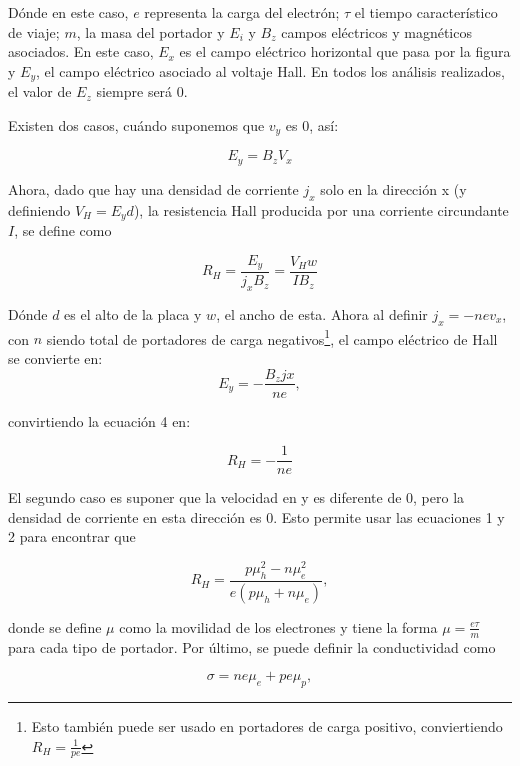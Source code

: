 \documentclass[%
 reprint,
 amsmath,amssymb,
 aps,
]{revtex4-1}
\begin{document}
Dónde en este caso, $e$ representa la carga del electrón; $\tau$ el tiempo característico de viaje; $m$, la masa del portador y $E_i$ y $B_z$ campos eléctricos y magnéticos asociados. En este caso, $E_x$ es el campo eléctrico horizontal que pasa por la figura y $E_y$, el campo eléctrico asociado al voltaje Hall. En todos los análisis realizados, el valor de $E_z$ siempre será 0.

Existen dos casos, cuándo suponemos que $v_y$ es 0, así:

\begin{equation*}
    E_y=B_zV_x 
\end{equation*}

Ahora, dado que hay una densidad de corriente $j_x$ solo en la dirección x (y definiendo $V_H=E_yd$), la resistencia Hall producida por una corriente circundante $I$, se define como 

\begin{equation}
  R_H=\frac{E_y}{j_xB_z}=\frac{V_Hw}{IB_z}
\end{equation}

Dónde $d$ es el alto de la placa y $w$, el ancho de esta.  Ahora al definir $j_x=-nev_x$, con $n$ siendo total de portadores de carga negativos\footnote{Esto también puede ser usado en portadores de carga positivo, conviertiendo $R_H=\frac{1}{pe}$}, el campo eléctrico de Hall se convierte en:
\begin{equation*}
    E_y=-\frac{B_zjx}{ne},
\end{equation*}

convirtiendo la ecuación 4 en:

\begin{equation}
    R_H=-\frac{1}{ne}
\end{equation}

El segundo caso es suponer que la velocidad en y es diferente de 0, pero la densidad de corriente en esta dirección es 0. Esto permite usar las ecuaciones 1 y 2 para encontrar que 

\begin{equation}
    R_H=\frac{ p\mu_h^2-n\mu_e^2}{e( p\mu_h+n\mu_e)},
\end{equation}

donde se define $\mu$ como la movilidad de los electrones y tiene la forma $\mu=\frac{e\tau}{m}$ para cada tipo de portador. Por último, se puede definir la conductividad como

\begin{equation*}
    \sigma=ne\mu_e + pe\mu_p,
\end{equation*}
\end{document}
